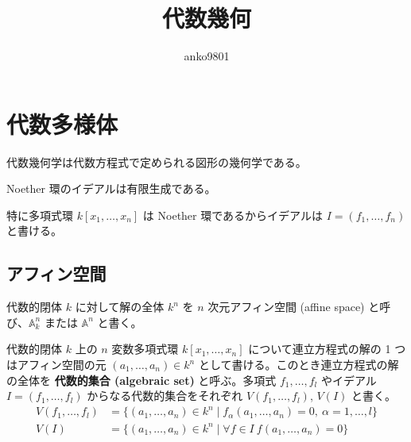 \documentclass[uplatex,dvipdfmx,a4paper,11pt]{jlreq}
\title{代数幾何}
\author{anko9801}
\renewcommand{\AA}{\mathbb{A}}
\numberwithin{equation}{section}
\theoremstyle{definition}
\begin{document}
\maketitle
\tableofcontents
\clearpage

\section{代数多様体}
代数幾何学は代数方程式で定められる図形の幾何学である。
\begin{theorem}
  Noether 環のイデアルは有限生成である。

  特に多項式環 $k[x_1,\ldots,x_n]$ は Noether 環であるからイデアルは $I = (f_1,\ldots,f_n)$ と書ける。
\end{theorem}

\subsection{アフィン空間}
\begin{definition}[アフィン空間]
  代数的閉体 $k$ に対して解の全体 $k^n$ を $n$ 次元アフィン空間 (affine space) と呼び、$\AA_k^n$ または $\AA^n$ と書く。
\end{definition}
代数的閉体 $k$ 上の $n$ 変数多項式環 $k[x_1,\ldots,x_n]$ について連立方程式の解の 1 つはアフィン空間の元 $(a_1,\ldots,a_n)\in k^n$ として書ける。このとき連立方程式の解の全体を \textbf{代数的集合 (algebraic set)} と呼ぶ。多項式 $f_1,\ldots,f_l$ やイデアル $I = (f_1,\ldots,f_l)$ からなる代数的集合をそれぞれ $V(f_1,\ldots,f_l)$, $V(I)$ と書く。
\begin{align}
  V(f_1, \ldots, f_l) & = \lbrace(a_1, \ldots, a_n)\in k^n\mid f_\alpha(a_1,\ldots,a_n) = 0,\ \alpha = 1,\ldots,l\rbrace \\
  V(I)                & = \lbrace(a_1, \ldots, a_n)\in k^n\mid \forall f\in I \ f(a_1,\ldots,a_n) = 0\rbrace
\end{align}
\end{document}
